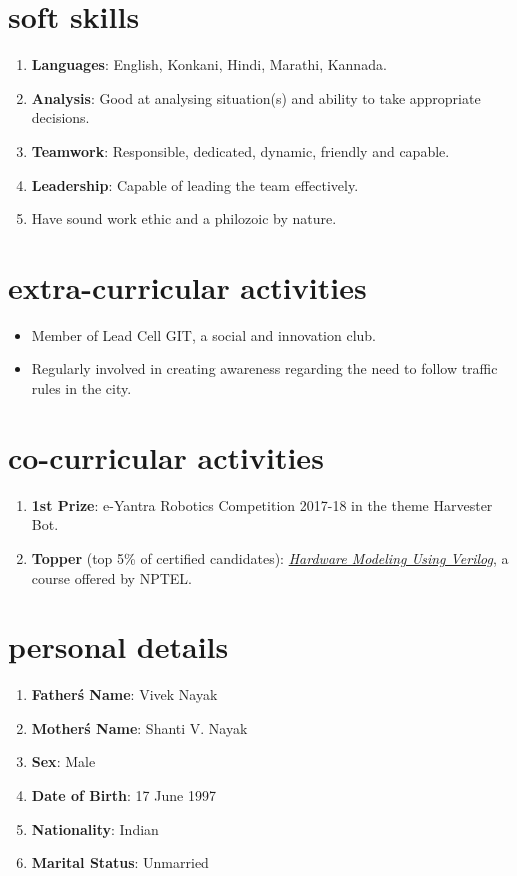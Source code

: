 \documentclass[10pt]{article}
\begin{document}
	\section*{soft skills}
	\begin{enumerate}
		\item \textbf{Languages}: English, Konkani, Hindi, Marathi, Kannada.
		\item \textbf{Analysis}: Good at analysing situation(s) and ability to take appropriate decisions.
		\item\textbf{Teamwork}: Responsible, dedicated, dynamic, friendly and capable.
		\item\textbf{Leadership}: Capable of leading the team effectively. 
		\item Have sound work ethic and a philozoic by nature.
	\end{enumerate}

	\section*{extra-curricular activities}
	\begin{itemize}
		\item Member of Lead Cell GIT, a social and innovation club.
		\item Regularly involved in creating awareness regarding the need to follow traffic rules in the city.
	\end{itemize}

	\section*{co-curricular activities}
	\begin{enumerate}
		\item \textbf{1st Prize}: e-Yantra Robotics Competition 2017-18 in the theme Harvester Bot.
		\item \textbf{Topper} (top 5\% of certified candidates): \href{http://nptel.ac.in/noc/E_Certificate/noc17-cs21/NPTEL17CS21S1150001171010224.jpg}{\textit{Hardware Modeling Using Verilog}}, a course offered by NPTEL.
	\end{enumerate}

	\section*{personal details}
	\begin{enumerate}
		\item \textbf{Father\'s Name}: Vivek Nayak
		\item \textbf{Mother\'s Name}: Shanti V. Nayak
		\item \textbf{Sex}: Male
		\item \textbf{Date of Birth}: 17 June 1997
		\item \textbf{Nationality}: Indian
		\item \textbf{Marital Status}: Unmarried
	\end{enumerate}
\end{document}

